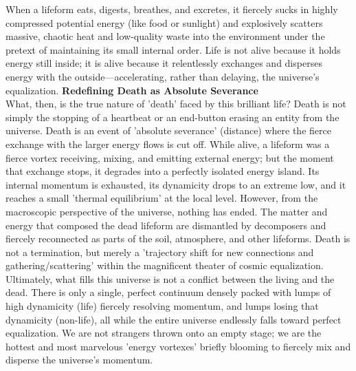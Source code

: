 When a lifeform eats, digests, breathes, and excretes, it fiercely sucks in highly compressed potential energy (like food or sunlight) and explosively scatters massive, chaotic heat and low-quality waste into the environment under the pretext of maintaining its small internal order. Life is not alive because it holds energy still inside; it is alive because it relentlessly exchanges and disperses energy with the outside—accelerating, rather than delaying, the universe's equalization.
\textbf{Redefining Death as Absolute Severance} \\
What, then, is the true nature of 'death' faced by this brilliant life? Death is not simply the stopping of a heartbeat or an end-button erasing an entity from the universe. Death is an event of 'absolute severance' (distance) where the fierce exchange with the larger energy flows is cut off.
While alive, a lifeform was a fierce vortex receiving, mixing, and emitting external energy; but the moment that exchange stops, it degrades into a perfectly isolated energy island. Its internal momentum is exhausted, its dynamicity drops to an extreme low, and it reaches a small 'thermal equilibrium' at the local level.
However, from the macroscopic perspective of the universe, nothing has ended. The matter and energy that composed the dead lifeform are dismantled by decomposers and fiercely reconnected as parts of the soil, atmosphere, and other lifeforms. Death is not a termination, but merely a 'trajectory shift for new connections and gathering/scattering' within the magnificent theater of cosmic equalization.
Ultimately, what fills this universe is not a conflict between the living and the dead. There is only a single, perfect continuum densely packed with lumps of high dynamicity (life) fiercely resolving momentum, and lumps losing that dynamicity (non-life), all while the entire universe endlessly falls toward perfect equalization. We are not strangers thrown onto an empty stage; we are the hottest and most marvelous 'energy vortexes' briefly blooming to fiercely mix and disperse the universe's momentum.

